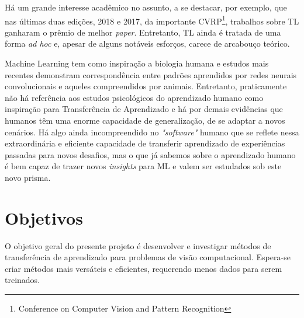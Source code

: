 \documentclass[
12pt, %
a4paper, %
onecolumn, %
]{article}
\begin{document}
Há um grande interesse acadêmico no assunto, a se destacar, por exemplo, que nas últimas duas edições, 2018 e 2017, da importante CVRP\footnote{Conference on Computer Vision and Pattern Recognition}, trabalhos sobre TL ganharam o prêmio de melhor \textit{paper}. Entretanto, TL ainda é tratada de uma forma \textit{ad hoc} e, apesar de alguns notáveis esforços, carece de arcabouço teórico.

Machine Learning tem como inspiração a biologia humana e estudos mais recentes demonstram correspondência entre padrões aprendidos por redes neurais convolucionais e aqueles compreendidos por animais. Entretanto, praticamente não há referência aos estudos psicológicos do aprendizado humano como inspiração para Transferência de Aprendizado e há por demais evidências que humanos têm uma enorme capacidade de generalização, de se adaptar a novos cenários. Há algo ainda incompreendido no \textit{"software"} humano que se reflete nessa extraordinária e eficiente capacidade de transferir aprendizado de experiências passadas para novos desafios, mas o que já sabemos sobre o aprendizado humano é bem capaz de trazer novos \textit{insights} para ML e valem ser estudados sob este novo prisma.




\section{Objetivos}

O objetivo geral do presente projeto é desenvolver e investigar métodos de transferência de aprendizado para problemas de visão computacional. Espera-se criar métodos mais versáteis e eficientes, requerendo menos dados para serem treinados.
\end{document}
